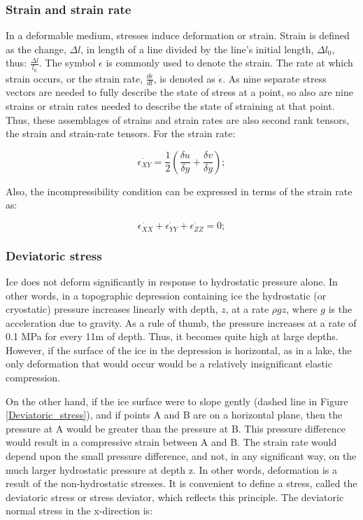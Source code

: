 \documentclass{article}
\begin{document}
\subsubsection{Strain and strain rate}
In a deformable medium, stresses induce deformation or strain. Strain is deﬁned as the change, $\Delta l$, in length of a line divided by the line's initial length, $\Delta l_0$, thus: $\frac{\Delta l}{l_0}$. The symbol $\epsilon$ is commonly used to denote the strain. The rate at which strain occurs, or the strain rate, $\frac{d\epsilon}{dt}$, is denoted as $\dot{\epsilon}$. As nine separate stress vectors are needed to fully describe the state of stress at a point, so also are nine strains or strain rates needed to describe the state of straining at that point. Thus, these assemblages of strains and strain rates are also second rank tensors, the strain and strain-rate tensors. For the strain rate:

\begin{equation}
	\dot{\epsilon_{XY}}=\frac{1}{2}({\frac{\delta u}{\delta y}+\frac{\delta v}{\delta y}});
\end{equation}

Also, the incompressibility condition can be expressed in terms of the strain rate as:

\begin{equation}
	\dot{\epsilon_{XX}}+\dot{\epsilon_{YY}}+\dot{\epsilon_{ZZ}}=0;
\end{equation}

\subsubsection{Deviatoric stress}

Ice does not deform signiﬁcantly in response to hydrostatic pressure alone. In other words, in a topographic depression containing ice the hydrostatic (or
cryostatic) pressure increases linearly with depth, $z$, at a rate $\rho gz$, where $g$ is the acceleration due to gravity. As a rule of thumb, the pressure increases at a rate of 0.1 MPa for every 11m of depth. Thus, it becomes quite high at large depths. However, if the surface of the ice in the depression is horizontal, as in a lake, the only deformation that would occur would be a relatively insigniﬁcant elastic compression.

On the other hand, if the ice surface were to slope gently (dashed line in
Figure \ref{Deviatoric_stress}), and if points A and B are on a horizontal plane, then the pressure at A would be greater than the pressure at B. This pressure difference would result in a compressive strain between A and B. The strain rate would depend upon the small pressure difference, and not, in any signiﬁcant way, on the much larger hydrostatic pressure at depth z. In other words, deformation is a result of the non-hydrostatic stresses. It is convenient to deﬁne a stress, called the deviatoric stress or stress deviator, which reﬂects this principle. The deviatoric normal stress in the x-direction is:
\end{document}
